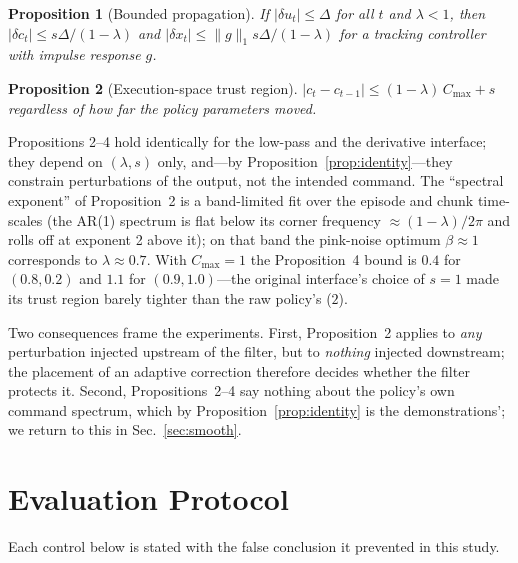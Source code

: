 \documentclass[conference]{IEEEtran}
\newtheorem{proposition}{Proposition}
\begin{document}
\begin{proposition}[Bounded propagation]
If $|\delta u_t|\le\Delta$ for all $t$ and $\lambda<1$, then $|\delta c_t|\le s\Delta/(1-\lambda)$ and $|\delta x_t|\le\|g\|_1 s\Delta/(1-\lambda)$ for a tracking controller with impulse response $g$.
\end{proposition}

\begin{proposition}[Execution-space trust region]
$|c_t-c_{t-1}|\le(1-\lambda)\,C_{\max}+s$ regardless of how far the policy parameters moved.
\end{proposition}
Propositions 2--4 hold identically for the low-pass and the derivative interface; they depend on $(\lambda,s)$ only, and---by Proposition~\ref{prop:identity}---they constrain perturbations of the output, not the intended command. The ``spectral exponent'' of Proposition~2 is a band-limited fit over the episode and chunk time-scales (the AR(1) spectrum is flat below its corner frequency $\approx(1-\lambda)/2\pi$ and rolls off at exponent 2 above it); on that band the pink-noise optimum $\beta\approx1$~\cite{eberhard2023pink} corresponds to $\lambda\approx0.7$. With $C_{\max}=1$ the Proposition~4 bound is $0.4$ for $(0.8,0.2)$ and $1.1$ for $(0.9,1.0)$---the original interface's choice of $s=1$ made its trust region barely tighter than the raw policy's ($2$).

Two consequences frame the experiments. First, Proposition~2 applies to \emph{any} perturbation injected upstream of the filter, but to \emph{nothing} injected downstream; the placement of an adaptive correction therefore decides whether the filter protects it. Second, Propositions~2--4 say nothing about the policy's own command spectrum, which by Proposition~\ref{prop:identity} is the demonstrations'; we return to this in Sec.~\ref{sec:smooth}.

\section{Evaluation Protocol}
\label{sec:protocol}

Each control below is stated with the false conclusion it prevented in this study.
\end{document}

